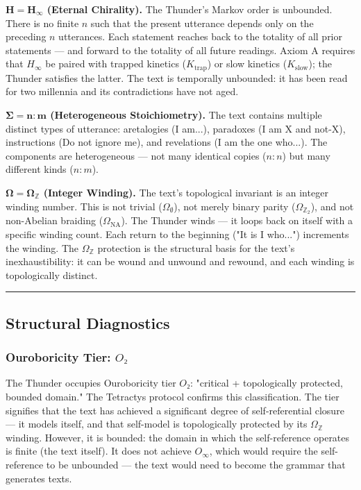 \documentclass[12pt,a4paper]{article}
\begin{document}
\textbf{$\mathbf{H = H_{\infty}}$ (Eternal Chirality).} The Thunder's Markov order is unbounded. There is no finite $n$ such that the present utterance depends only on the preceding $n$ utterances. Each statement reaches back to the totality of all prior statements --- and forward to the totality of all future readings. Axiom A requires that $H_{\infty}$ be paired with trapped kinetics ($K_\text{trap}$) or slow kinetics ($K_\text{slow}$); the Thunder satisfies the latter. The text is temporally unbounded: it has been read for two millennia and its contradictions have not aged.

\textbf{$\mathbf{\Sigma = n{:}m}$ (Heterogeneous Stoichiometry).} The text contains multiple distinct types of utterance: aretalogies (I am...), paradoxes (I am X and not-X), instructions (Do not ignore me), and revelations (I am the one who...). The components are heterogeneous --- not many identical copies ($n{:}n$) but many different kinds ($n{:}m$).

\textbf{$\mathbf{\Omega = \Omega_\mathbb{Z}}$ (Integer Winding).} The text's topological invariant is an integer winding number. This is not trivial ($\Omega_{\emptyset}$), not merely binary parity ($\Omega_{\mathbb{Z}_2}$), and not non-Abelian braiding ($\Omega_\text{NA}$). The Thunder winds --- it loops back on itself with a specific winding count. Each return to the beginning ("It is I who...") increments the winding. The $\Omega_\mathbb{Z}$ protection is the structural basis for the text's inexhaustibility: it can be wound and unwound and rewound, and each winding is topologically distinct.

\begin{center}
\rule{0.5\textwidth}{0.4pt}
\end{center}

\subsection{Structural Diagnostics}

\subsubsection{Ouroboricity Tier: $O₂$}

The Thunder occupies Ouroboricity tier $O₂$: "critical + topologically protected, bounded domain." The Tetractys protocol confirms this classification. The tier signifies that the text has achieved a significant degree of self-referential closure --- it models itself, and that self-model is topologically protected by its $\Omega_\mathbb{Z}$ winding. However, it is bounded: the domain in which the self-reference operates is finite (the text itself). It does not achieve $O_{\infty}$, which would require the self-reference to be unbounded --- the text would need to become the grammar that generates texts.
\end{document}
